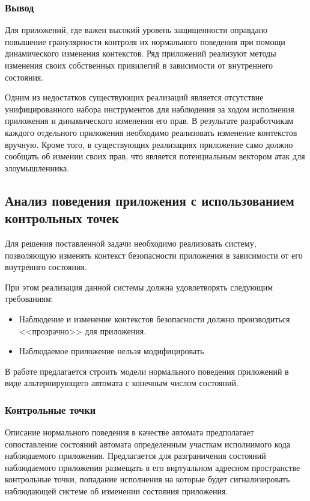 \subsubsection{Вывод}

Для приложений, где важен высокий уровень защищенности
оправдано повышение гранулярности контроля их
нормального поведения при помощи динамического
изменения контекстов. Ряд приложений реализуют
методы изменения своих собственных привилегий
в зависимости от внутреннего состояния.

Одним из недостатков существующих реализаций
является отсутствие унифицированного набора инструментов
для наблюдения за ходом исполнения приложения
и динамического изменения его прав. В результате
разработчикам каждого отдельного приложения
необходимо реализовать изменение контекстов
вручную. Кроме того, в существующих реализациях
приложение само должно сообщать об измении своих
прав, что является потенциальным вектором атак
для злоумышленника.


\subsection{Анализ поведения приложения с использованием
                                        контрольных точек}

Для решения поставленной задачи необходимо реализовать
систему, позволяющую изменять контекст безопасности
приложения в зависимости от его внутреннго состояния.

При этом реализация данной системы должна удовлетворять
следующим требованиям:

\begin{itemize}
\item Наблюдение и изменение контекстов безопасности должно
        производиться <<прозрачно>> для приложения.
\item Наблюдаемое приложение нельзя модифицировать
\end{itemize}

В работе предлагается строить модели нормального поведения
приложений в виде альтернирующего автомата с конечным числом
состояний. 

\subsubsection{Контрольные точки}

Описание нормального поведения в качестве
автомата предполагает сопоставление состояний автомата
определенным участкам исполнимого кода наблюдаемого приложения.  Предлагается для разграничения состояний наблюдаемого приложения
размещать в его виртуальном адресном пространстве контрольные точки,
попадание исполнения на которые будет сигнализировать наблюдающей 
системе об изменении состояния приложения.

